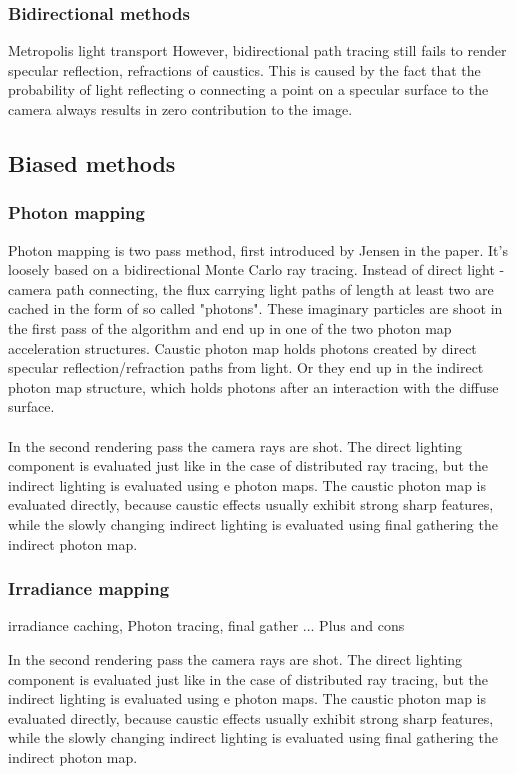 \subsubsection{Bidirectional methods}

Metropolis light transport \cite{Veach97metropolislight}
However, bidirectional path tracing still fails to render specular reflection, refractions of caustics. This is caused by the fact that the probability of light reflecting o connecting a point on a specular surface to the camera always results in zero contribution to the image.



\subsection{Biased methods}


\subsubsection{Photon mapping}
Photon mapping is two pass method, first introduced by Jensen in the \cite{Jensen:1996} paper. It's loosely based on a bidirectional Monte Carlo ray tracing. Instead of direct light - camera path connecting, the flux carrying light paths of length at least two are cached in the form of so called "photons". These imaginary particles are shoot in the first pass of the algorithm and end up in one of the two photon map acceleration structures. Caustic photon map holds photons created by direct specular reflection/refraction paths from light. Or they end up in the indirect photon map structure, which holds photons after an interaction with the diffuse surface.
\\
\\
In the second rendering pass the camera rays are shot. The direct lighting component is
evaluated just like in the case of distributed ray tracing, but the indirect lighting is evaluated
using e photon maps. The caustic photon map is evaluated directly, because caustic effects
usually exhibit strong sharp features, while the slowly changing indirect lighting is evaluated
using final gathering the indirect photon map.


\subsubsection{Irradiance mapping}
\cite{jarosz08thesis} %
irradiance caching, Photon tracing, final gather ...
Plus and cons



In the second rendering pass the camera rays are shot. The direct lighting component is evaluated just like in the case of distributed ray tracing, but the indirect lighting is evaluated using e photon maps. The caustic photon map is evaluated directly, because caustic effects usually exhibit strong sharp features, while the slowly changing indirect lighting is evaluated using final gathering the indirect photon map.



